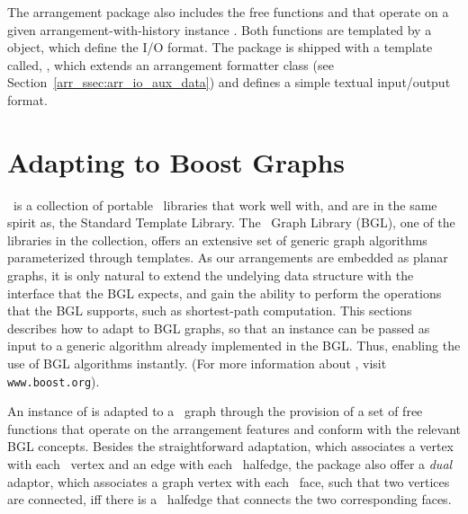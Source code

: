 
\begin{ccAdvanced}
The arrangement package also includes the free functions
 and  that
operate on a given arrangement-with-history instance .
Both functions are templated by a  object, which define
the I/O format. The package is shipped with a template called,
, which extends
an arrangement formatter class (see Section~\ref{arr_ssec:arr_io_aux_data})
and defines a simple textual input/output format.
\end{ccAdvanced}

\section{Adapting to {\sc Boost} Graphs}
\label{arr_sec:bgl}
%
\boost\ is a collection of portable \Cpp\ libraries that work well with,
and are in the same spirit as, the Standard Template Library. The
\boost\ Graph Library (BGL), one of the libraries in the collection,
offers an extensive set of generic graph algorithms parameterized through
templates. As our arrangements are embedded as planar graphs, it is only 
natural to extend the undelying data structure with the interface that the 
BGL expects, and gain the ability to perform the operations that the BGL 
supports, such as shortest-path computation. This sections describes how to 
adapt  to BGL graphs, so that an 
instance can be passed as input to a generic algorithm already implemented 
in the BGL. Thus, enabling the use of BGL algorithms instantly. (For more 
information about \boost, visit {\tt www.boost.org}).

An instance of  is adapted to a \boost\ graph through the
provision of a set of free functions that operate on the arrangement features
and conform with the relevant BGL concepts. Besides the straightforward 
adaptation, which associates a vertex with each \dcel\ vertex and an edge 
with each \dcel\ halfedge, the package also offer a {\em dual} adaptor, which 
associates a graph vertex with each \dcel\ face, such that two vertices are 
connected, iff there is a \dcel\ halfedge that connects the two corresponding
faces. 

